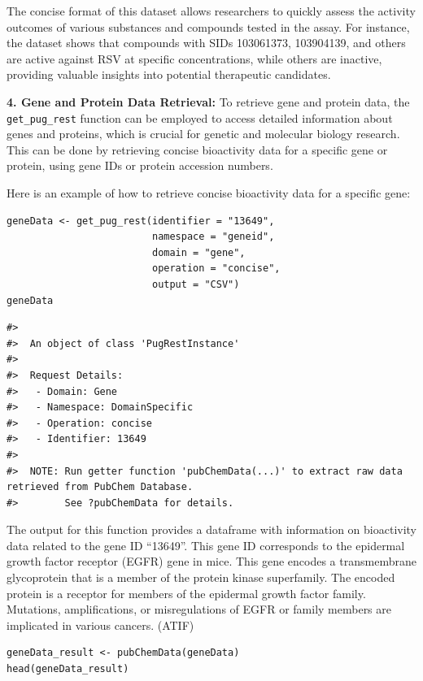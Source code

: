 The concise format of this dataset allows researchers to quickly assess the activity outcomes of various substances and compounds tested in the assay. For instance, the dataset shows that compounds with SIDs 103061373, 103904139, and others are active against RSV at specific concentrations, while others are inactive, providing valuable insights into potential therapeutic candidates.

\textbf{4. Gene and Protein Data Retrieval:} To retrieve gene and protein data, the \texttt{get\_pug\_rest} function can be employed to access detailed information about genes and proteins, which is crucial for genetic and molecular biology research. This can be done by retrieving concise bioactivity data for a specific gene or protein, using gene IDs or protein accession numbers.

Here is an example of how to retrieve concise bioactivity data for a specific gene:

\begin{verbatim}
geneData <- get_pug_rest(identifier = "13649", 
                         namespace = "geneid", 
                         domain = "gene", 
                         operation = "concise", 
                         output = "CSV")
geneData
\end{verbatim}

\begin{verbatim}
#> 
#>  An object of class 'PugRestInstance'
#> 
#>  Request Details:  
#>   - Domain: Gene
#>   - Namespace: DomainSpecific
#>   - Operation: concise
#>   - Identifier: 13649
#> 
#>  NOTE: Run getter function 'pubChemData(...)' to extract raw data retrieved from PubChem Database. 
#>        See ?pubChemData for details.
\end{verbatim}

The output for this function provides a dataframe with information on bioactivity data related to the gene ID ``13649''. This gene ID corresponds to the epidermal growth factor receptor (EGFR) gene in mice. This gene encodes a transmembrane glycoprotein that is a member of the protein kinase superfamily. The encoded protein is a receptor for members of the epidermal growth factor family. Mutations, amplifications, or misregulations of EGFR or family members are implicated in various cancers. (ATIF)

\begin{verbatim}
geneData_result <- pubChemData(geneData)
head(geneData_result)
\end{verbatim}

